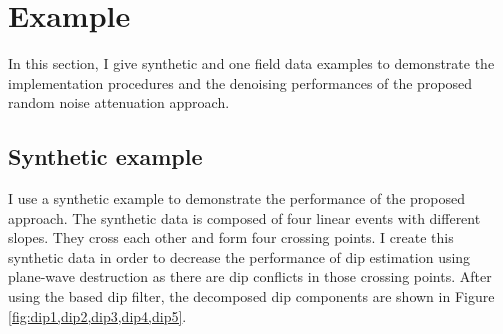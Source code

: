 \section{Example}
In this section, I give  synthetic and one field data examples to demonstrate the implementation procedures and the denoising performances of the proposed  random noise attenuation approach. 

\subsection{Synthetic example}
I  use a  synthetic example  to demonstrate the performance of the proposed approach. The synthetic data is composed of four linear events with different slopes. They cross each other and form four crossing points. I create this synthetic data in order to decrease the performance of dip estimation using plane-wave destruction as there are dip conflicts in those crossing points. After using the  based dip filter, the decomposed dip components are shown in Figure \ref{fig:dip1,dip2,dip3,dip4,dip5}. %

